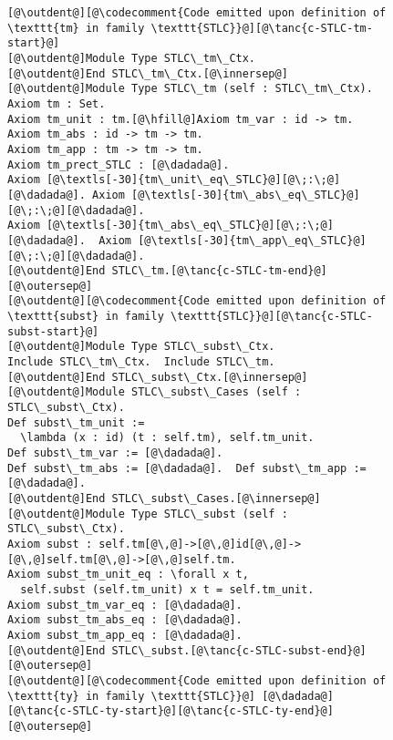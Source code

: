 \begin{figure}
\vspace{-5pt}
\begin{minipage}{\textwidth}
\begin{multicols}{2}



\newcommand{\innersep}{\vspace{6pt}}
\newcommand{\outersep}{\vspace{5pt}}
\newcommand{\outdent}{\!\!\!}

\begin{lstlisting}
[@\outdent@][@\codecomment{Code emitted upon definition of \texttt{tm} in family \texttt{STLC}}@][@\tanc{c-STLC-tm-start}@]
[@\outdent@]Module Type STLC\_tm\_Ctx.
[@\outdent@]End STLC\_tm\_Ctx.[@\innersep@]
[@\outdent@]Module Type STLC\_tm (self : STLC\_tm\_Ctx).
Axiom tm : Set.
Axiom tm_unit : tm.[@\hfill@]Axiom tm_var : id -> tm.
Axiom tm_abs : id -> tm -> tm.
Axiom tm_app : tm -> tm -> tm.
Axiom tm_prect_STLC : [@\dadada@].
Axiom [@\textls[-30]{tm\_unit\_eq\_STLC}@][@\;:\;@][@\dadada@]. Axiom [@\textls[-30]{tm\_abs\_eq\_STLC}@][@\;:\;@][@\dadada@].
Axiom [@\textls[-30]{tm\_abs\_eq\_STLC}@][@\;:\;@][@\dadada@].  Axiom [@\textls[-30]{tm\_app\_eq\_STLC}@][@\;:\;@][@\dadada@].
[@\outdent@]End STLC\_tm.[@\tanc{c-STLC-tm-end}@][@\outersep@]
[@\outdent@][@\codecomment{Code emitted upon definition of \texttt{subst} in family \texttt{STLC}}@][@\tanc{c-STLC-subst-start}@]
[@\outdent@]Module Type STLC\_subst\_Ctx.
Include STLC\_tm\_Ctx.  Include STLC\_tm.
[@\outdent@]End STLC\_subst\_Ctx.[@\innersep@]
[@\outdent@]Module STLC\_subst\_Cases (self : STLC\_subst\_Ctx).
Def subst\_tm_unit :=
  \lambda (x : id) (t : self.tm), self.tm_unit.
Def subst\_tm_var := [@\dadada@].
Def subst\_tm_abs := [@\dadada@].  Def subst\_tm_app := [@\dadada@].
[@\outdent@]End STLC\_subst\_Cases.[@\innersep@]
[@\outdent@]Module Type STLC\_subst (self : STLC\_subst\_Ctx).
Axiom subst : self.tm[@\,@]->[@\,@]id[@\,@]->[@\,@]self.tm[@\,@]->[@\,@]self.tm.
Axiom subst_tm_unit_eq : \forall x t,
  self.subst (self.tm_unit) x t = self.tm_unit.
Axiom subst_tm_var_eq : [@\dadada@].
Axiom subst_tm_abs_eq : [@\dadada@].
Axiom subst_tm_app_eq : [@\dadada@].
[@\outdent@]End STLC\_subst.[@\tanc{c-STLC-subst-end}@][@\outersep@]
[@\outdent@][@\codecomment{Code emitted upon definition of \texttt{ty} in family \texttt{STLC}}@] [@\dadada@][@\tanc{c-STLC-ty-start}@][@\tanc{c-STLC-ty-end}@][@\outersep@]

\end{lstlisting}
\end{multicols}
\end{minipage}
\end{figure}
